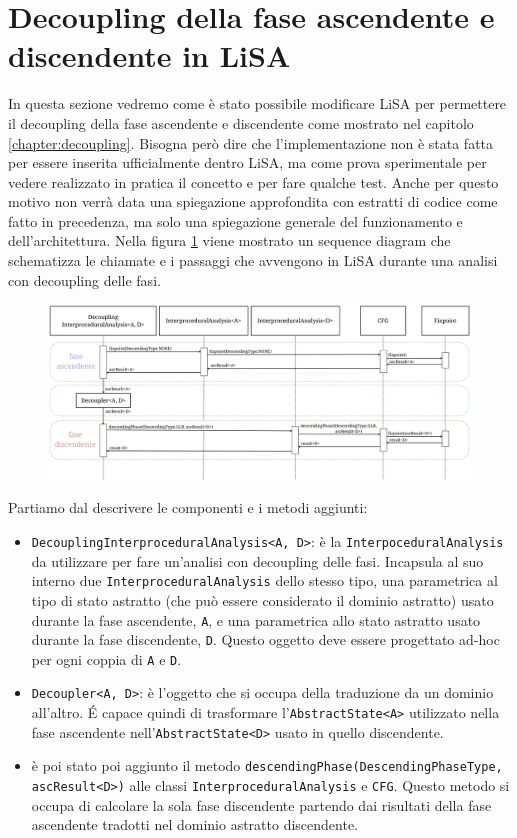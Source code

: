 \section{Decoupling della fase ascendente e discendente in LiSA}
In questa sezione vedremo come è stato possibile modificare LiSA per permettere il decoupling della fase ascendente e discendente come mostrato nel capitolo \ref{chapter:decoupling}. Bisogna però dire che l'implementazione non è stata fatta per essere inserita ufficialmente dentro LiSA, ma come prova sperimentale per vedere realizzato in pratica il concetto e per fare qualche test. Anche per questo motivo non verrà data una spiegazione approfondita con estratti di codice come fatto in precedenza, ma solo una spiegazione generale del funzionamento e dell'architettura. Nella figura \ref{fig:flowDecoupling} viene mostrato un sequence diagram che schematizza le chiamate e i passaggi che avvengono in LiSA durante una analisi con decoupling delle fasi. 
\begin{figure}[ht]
	\centering
	\includegraphics[width=\textwidth]{Immagini/decouplingFlow.png}
	\caption{}
	\label{fig:flowDecoupling}
\end{figure}
Partiamo dal descrivere le componenti e i metodi aggiunti:
\begin{itemize}
\itemsep0pt
    \item \texttt{DecouplingInterproceduralAnalysis<A, D>}: è la \texttt{InterpoceduralAnalysis} da utilizzare per fare un'analisi con decoupling delle fasi. Incapsula al suo interno due \texttt{InterproceduralAnalysis} dello stesso tipo, una parametrica al tipo di stato astratto (che può essere considerato il dominio astratto) usato durante la fase ascendente, \texttt{A}, e una parametrica allo stato astratto usato durante la fase discendente, \texttt{D}. Questo oggetto deve essere progettato ad-hoc per ogni coppia di \texttt{A} e \texttt{D}. 
    \item \texttt{Decoupler<A, D>}: è l'oggetto che si occupa della traduzione da un dominio all'altro. \'E capace quindi di trasformare l'\texttt{AbstractState<A>} utilizzato nella fase ascendente nell'\texttt{AbstractState<D>} usato in quello discendente. 
    \item è poi stato poi aggiunto il metodo \texttt{descendingPhase(DescendingPhaseType, ascResult<D>)} alle classi \texttt{InterproceduralAnalysis} e \texttt{CFG}. Questo metodo si occupa di calcolare la sola fase discendente partendo dai risultati della fase ascendente tradotti nel dominio astratto discendente.
\end{itemize}